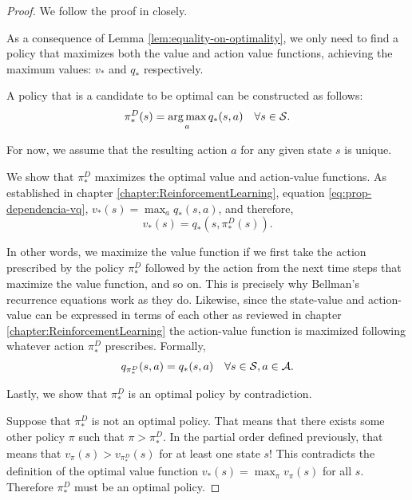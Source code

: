 \begin{proof}
    We follow the proof in \cite[pg.~115]{raoRL4F} closely.

    As a consequence of Lemma \ref{lem:equality-on-optimality}, we only need to
    find a policy that maximizes both the value and action value functions,
    achieving the maximum values: $v_*$ and $q_*$ respectively.

    A policy that is a candidate to be optimal can be constructed as follows:
    \begin{equation}
        \label{eq:greedy-policy-construction}
        \pi_{*}^{D} (s) = \operatorname*{arg\,max}_{a} q_{*} (s, a) \quad \forall s \in \mathcal{S}.
    \end{equation}

    For now, we assume that the resulting action $a$ for any given state $s$ is
    unique.

    We show that $\pi_{*}^{D}$ maximizes the optimal value and action-value
    functions. As established in chapter \ref{chapter:ReinforcementLearning},
    equation \eqref{eq:prop-dependencia-vq}, $v_* (s) = \max_a q_* (s, a)$, and
    therefore,
    \[
        v_* (s) = q_* (s, \pi_{*}^{D}(s)).
    \]

    In other words, we maximize the value function if we first take the action
    prescribed by the policy $\pi_{*}^{D}$ followed by the action from the next
    time steps that maximize the value function, and so on. This is precisely
    why Bellman's recurrence equations work as they do. Likewise, since the
    state-value and action-value can be expressed in terms of each other as
    reviewed in chapter \ref{chapter:ReinforcementLearning} the action-value
    function is maximized following whatever action $\pi_{*}^{D}$ prescribes.
    Formally,
    \[
        q_{\pi_{*}^{D}} (s, a) = q_* (s,a) \quad \forall s \in \mathcal{S}, a \in \mathcal{A}.
    \]

    Lastly, we show that $\pi_{*}^{D}$ is an optimal policy by contradiction.

    Suppose that $\pi_{*}^{D}$ is not an optimal policy. That means that there
    exists some other policy $\pi$ such that $\pi > \pi_{*}^{D}$. In the partial
    order defined previously, that means that $v_{\pi} (s) > v_{\pi_{*}^{D}}
    (s)$ for at least one state $s$! This contradicts the definition of the
    optimal value function $v_* (s) = \max_\pi v_\pi (s)$ for all $s$. Therefore
    $\pi_{*}^{D}$ must be an optimal policy.
\end{proof}

